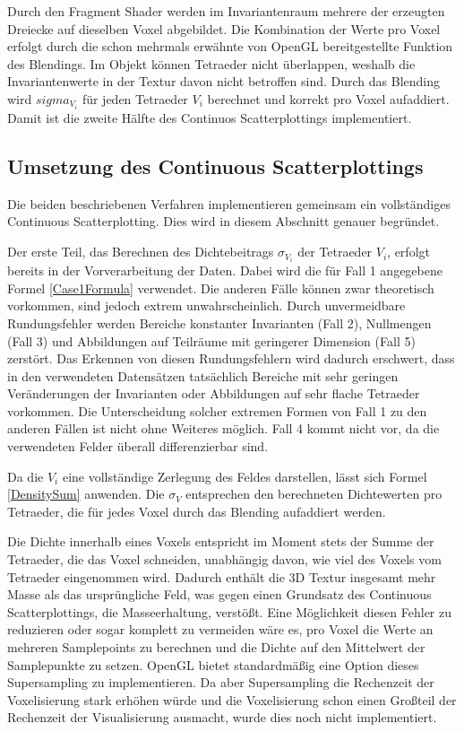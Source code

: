 \documentclass[a4paper,fontsize=12pt,toc=bib,halfparskip]{scrartcl}
\begin{document}
Durch den Fragment Shader werden im Invariantenraum mehrere der erzeugten Dreiecke auf dieselben Voxel abgebildet. Die Kombination der Werte pro Voxel erfolgt durch die schon mehrmals erw\"ahnte von OpenGL bereitgestellte Funktion des Blendings. Im Objekt k\"onnen Tetraeder nicht \"uberlappen, weshalb die Invariantenwerte in der Textur davon nicht betroffen sind. Durch das Blending wird $sigma_{V_i}$ f\"ur jeden Tetraeder $V_i$ berechnet und korrekt pro Voxel aufaddiert. Damit ist die zweite H\"alfte des Continuos Scatterplottings implementiert.

\subsection{Umsetzung des Continuous Scatterplottings}
\label{CSPImplementation}
Die beiden beschriebenen Verfahren implementieren gemeinsam ein vollst\"andiges Continuous Scatterplotting. Dies wird in diesem Abschnitt genauer begr\"undet.

Der erste Teil, das Berechnen des Dichtebeitrags $\sigma_{V_i}$ der Tetraeder $V_i$, erfolgt bereits in der Vorverarbeitung der Daten. Dabei wird die f\"ur Fall 1 angegebene Formel \ref{Case1Formula} verwendet. Die anderen F\"alle k\"onnen zwar theoretisch vorkommen, sind jedoch extrem unwahrscheinlich. Durch unvermeidbare Rundungsfehler werden Bereiche konstanter Invarianten (Fall 2), Nullmengen (Fall 3) und Abbildungen auf Teilr\"aume mit geringerer Dimension (Fall 5) zerst\"ort. Das Erkennen von diesen Rundungsfehlern wird dadurch erschwert, dass in den verwendeten Datens\"atzen tats\"achlich Bereiche mit sehr geringen Ver\"anderungen der Invarianten oder Abbildungen auf sehr flache Tetraeder vorkommen. Die Unterscheidung solcher extremen Formen von Fall 1 zu den anderen F\"allen ist nicht ohne Weiteres m\"oglich. Fall 4 kommt nicht vor, da die verwendeten Felder \"uberall differenzierbar sind.

Da die $V_i$ eine vollst\"andige Zerlegung des Feldes darstellen, l\"asst sich Formel \ref{DensitySum} anwenden. Die $\sigma_V$ entsprechen den berechneten Dichtewerten pro Tetraeder, die f\"ur jedes Voxel durch das Blending aufaddiert werden.

Die Dichte innerhalb eines Voxels entspricht im Moment stets der Summe der Tetraeder, die das Voxel schneiden, unabh\"angig davon, wie viel des Voxels vom Tetraeder eingenommen wird. Dadurch enth\"alt die 3D Textur insgesamt mehr Masse als das urspr\"ungliche Feld, was gegen einen Grundsatz des Continuous Scatterplottings, die Masseerhaltung, verst\"o{\ss}t. Eine M\"oglichkeit diesen Fehler zu reduzieren oder sogar komplett zu vermeiden w\"are es, pro Voxel die Werte an mehreren Samplepoints zu berechnen und die Dichte auf den Mittelwert der Samplepunkte zu setzen. OpenGL bietet standardm\"a{\ss}ig eine Option dieses Supersampling zu implementieren. Da aber Supersampling die Rechenzeit der Voxelisierung stark erh\"ohen w\"urde und die Voxelisierung schon einen Gro{\ss}teil der Rechenzeit der Visualisierung ausmacht, wurde dies noch nicht implementiert.
\end{document}
